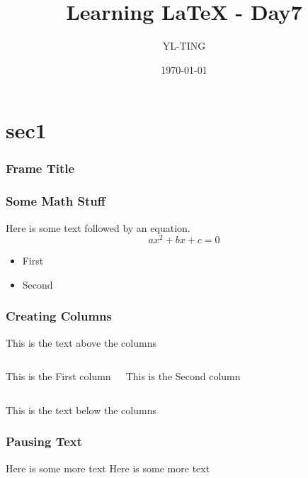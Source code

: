 \documentclass{beamer}
\author{YL-TING}
\title{Learning LaTeX - Day7}
\date{\today}
\begin{document}
    \section{sec1}
    \begin{frame}
        \frametitle{Frame Title}
        \maketitle
    \end{frame}

    \begin{frame}
        \frametitle{Some Math Stuff}
        Here is some text followed by an equation.
        \[ax^2+bx+c=0\]
        \begin{itemize}
            \item First 
            \item Second
        \end{itemize}
    \end{frame}

    \begin{frame}
        \frametitle{Creating Columns}
        This is the text above the columns
        \vspace{5mm}

        \begin{columns}
            
            This is the First column

            This is the Second column

        \end{columns}

        \vspace{5mm}
        This is the text below the columns
    \end{frame}

    \begin{frame}
        \frametitle{Pausing Text}
        Here is some more text
        \pause
        Here is some more text
    \end{frame}
\end{document}
